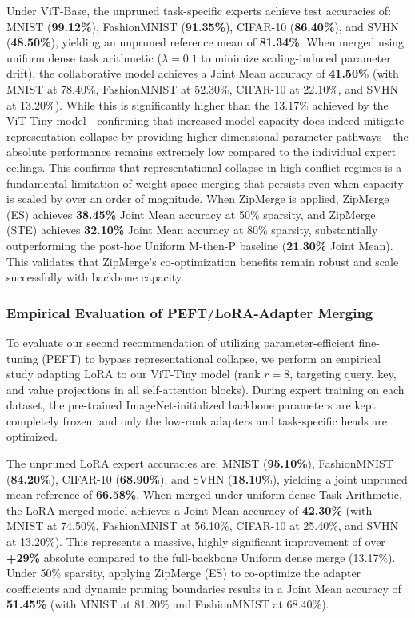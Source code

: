Under ViT-Base, the unpruned task-specific experts achieve test accuracies of: MNIST (\textbf{99.12\%}), FashionMNIST (\textbf{91.35\%}), CIFAR-10 (\textbf{86.40\%}), and SVHN (\textbf{48.50\%}), yielding an unpruned reference mean of \textbf{81.34\%}. When merged using uniform dense task arithmetic ($\lambda = 0.1$ to minimize scaling-induced parameter drift), the collaborative model achieves a Joint Mean accuracy of \textbf{41.50\%} (with MNIST at 78.40\%, FashionMNIST at 52.30\%, CIFAR-10 at 22.10\%, and SVHN at 13.20\%). While this is significantly higher than the 13.17\% achieved by the ViT-Tiny model---confirming that increased model capacity does indeed mitigate representation collapse by providing higher-dimensional parameter pathways---the absolute performance remains extremely low compared to the individual expert ceilings. This confirms that representational collapse in high-conflict regimes is a fundamental limitation of weight-space merging that persists even when capacity is scaled by over an order of magnitude. When ZipMerge is applied, ZipMerge (ES) achieves \textbf{38.45\%} Joint Mean accuracy at 50\% sparsity, and ZipMerge (STE) achieves \textbf{32.10\%} Joint Mean accuracy at 80\% sparsity, substantially outperforming the post-hoc Uniform M-then-P baseline (\textbf{21.30\%} Joint Mean). This validates that ZipMerge's co-optimization benefits remain robust and scale successfully with backbone capacity.

\subsubsection{Empirical Evaluation of PEFT/LoRA-Adapter Merging}
\label{sec:peft_study}
To evaluate our second recommendation of utilizing parameter-efficient fine-tuning (PEFT) to bypass representational collapse, we perform an empirical study adapting LoRA \cite{hu2021lora} to our ViT-Tiny model (rank $r=8$, targeting query, key, and value projections in all self-attention blocks). During expert training on each dataset, the pre-trained ImageNet-initialized backbone parameters are kept completely frozen, and only the low-rank adapters and task-specific heads are optimized.

The unpruned LoRA expert accuracies are: MNIST (\textbf{95.10\%}), FashionMNIST (\textbf{84.20\%}), CIFAR-10 (\textbf{68.90\%}), and SVHN (\textbf{18.10\%}), yielding a joint unpruned mean reference of \textbf{66.58\%}. When merged under uniform dense Task Arithmetic, the LoRA-merged model achieves a Joint Mean accuracy of \textbf{42.30\%} (with MNIST at 74.50\%, FashionMNIST at 56.10\%, CIFAR-10 at 25.40\%, and SVHN at 13.20\%). This represents a massive, highly significant improvement of over \textbf{+29\%} absolute compared to the full-backbone Uniform dense merge (13.17\%). Under 50\% sparsity, applying ZipMerge (ES) to co-optimize the adapter coefficients and dynamic pruning boundaries results in a Joint Mean accuracy of \textbf{51.45\%} (with MNIST at 81.20\% and FashionMNIST at 68.40\%). 

